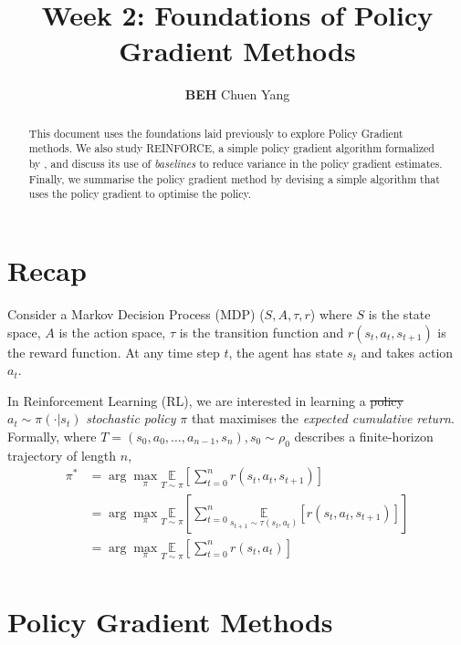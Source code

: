 \documentclass{article} %
\title{Week 2: Foundations of Policy Gradient Methods}
\author{\textbf{BEH} Chuen Yang}
\begin{document}
\ifcolmsubmission
\linenumbers
\fi

\maketitle

\begin{abstract}
This document uses the foundations laid previously to explore Policy Gradient methods.
We also study REINFORCE, a simple policy gradient algorithm formalized by \cite{Williams-1992},
and discuss its use of \textit{baselines} to reduce variance in the policy gradient estimates.
Finally, we summarise the policy gradient method by devising a simple algorithm that uses the policy gradient to optimise the policy.
\end{abstract}

\section{Recap}

Consider a Markov Decision Process (MDP) ($S, A, \tau, r$) where $S$ is the state space, $A$ is the action space, 
$\tau$ is the transition function and $r(s_t, a_t, s_{t + 1})$ is the reward function.
At any time step $t$, the agent has state $s_t$ and takes action $a_t$.

In Reinforcement Learning (RL), we are interested in learning a \st{policy $a_t \sim \pi(\cdot | s_t)$} {\color{red} \textit{stochastic policy} $\pi$} that maximises the 
\textit{expected cumulative return}.
Formally, where $T = (s_0, a_0, \dots, a_{n - 1}, s_n), s_0 \sim \rho_0$ describes a finite-horizon trajectory of length $n$,
\begin{equation} \label{mdp_obj}
    \begin{aligned}
    \pi^* & = \arg\max_\pi \underset{T \sim \pi}{\mathbb{E}} \left[ \sum_{t=0}^{n} r(s_t, a_t, s_{t + 1}) \right] \\
          & = \arg\max_\pi \underset{T \sim \pi}{\mathbb{E}} \left[ \sum_{t=0}^{n}  \underset{s_{t + 1} \sim \tau  (s_t, a_t)}{\mathbb{E}}[r(s_t, a_t, s_{t + 1})]\right] \\
          & = \arg\max_\pi \underset{T \sim \pi}{\mathbb{E}} \left[ \sum_{t=0}^{n}  r(s_t, a_t)\right] \\
    \end{aligned}
\end{equation}

\section{Policy Gradient Methods}
\end{document}
